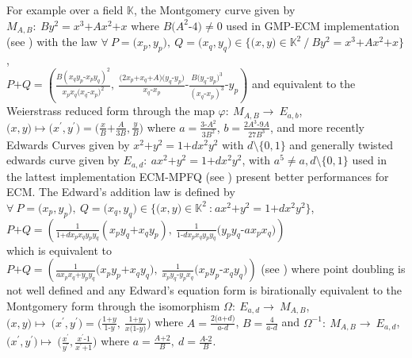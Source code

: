 \documentclass[sigconf,balance=false]{acmart}
\begin{document}
\begin{enumerate}
For example over a field $\mathbb{K}$, the Montgomery curve given by $M_{A, B}: \  By^{2}=x^{3}\text{+}Ax^{2}\text{+}x$ where $B\text{(}A^{2}\text{-}4\text{)}\neq 0$ used in GMP-ECM implementation (see \cite{gmp}) with the law $\forall \ P=\text{(}x_{p}, y_{p}\text{)}, \ Q=\text{(}x_{q}, y_{q}\text{)} \in \lbrace \text{(}x, y\text{)}\in \mathbb{K}^2 \ / \ By^{2}=x^{3}\text{+}Ax^{2}\text{+}x \rbrace$,\\ $P\text{+}Q=\left(\frac{B\left(x_{q}y_{p}\text{-}x_{p}y_{q}\right)^2}{x_{p}x_{q}\text{(}x_{q}\text{-}x_{p}\text{)}^2}, \ \frac{\text{(}2x_{p}\text{+}x_{q}\text{+}A\text{)}\text{(}y_{q}\text{-}y_{p}\text{)}}{x_{q}\text{-}x_{p}}\text{-}\frac{B\text{(}y_{q}\text{-}y_{p}\text{)}^3}{(x_{q}\text{-}x_{p})^3}\text{-}y_{p} \right)$ and equivalent to the Weierstrass reduced form through the map $\varphi: \ M_{A, B} \longrightarrow \ E_{a, b}$, $\text{(}x, y\text{)}\longmapsto \text{(}x^{'}, y^{'}\text{)}=\text{(}\frac{x}{B}\text{+}\frac{A}{3B}, \frac{y}{B}\text{)}$ where $a=\frac{3\text{-}A^2}{3B^2}$, $b=\frac{2A^3\text{-}9A}{27B^3}$, and more recently Edwards Curves given by $x^{2}\text{+}y^{2}=1\text{+}dx^{2}y^{2}$ with $ d\setminus \lbrace 0, 1 \rbrace$ and generally twisted edwards curve given by $E_{a, d}: \ ax^{2}\text{+}y^{2}=1\text{+}dx^{2}y^{2}$, with $a^{5}\neq a, d\setminus \lbrace 0, 1 \rbrace$ used in the lattest implementation ECM-MPFQ (see \cite{mpfq}) present better performances for ECM. The Edward's addition law is defined by $\forall \ P=\text{(}x_{p}, y_{p}\text{)}, \ Q=\text{(}x_{q}, y_{q}\text{)} \in \lbrace \text{(}x, y\text{)}\in \mathbb{K}^2 \ \text{:} \ ax^{2}\text{+}y^{2}=1\text{+}dx^{2}y^{2} \rbrace$,\\ $P\text{+}Q=\left(\frac{1}{1\text{+}dx_{p}x_{q}y_{p}y_{q}}(x_{p}y_{q}\text{+}x_{q}y_{p}), \ \frac{1}{1\text{-}dx_{p}x_{q}y_{p}y_{q}}\text{(}y_{p}y_{q}\text{-}ax_{p}x_{q}\text{)} \right)$\\
which is equivalent to\\
$P\text{+}Q= \left( \frac{1}{ax_{p}x_{q}\text{+}y_{p}y_{q}}\text{(}x_{p}y_{p}\text{+}x_{q}y_{q}\text{)}, \ \frac{1}{x_{p}y_{q}\text{-}y_{p}x_{q}}\text{(}x_{p}y_{p}\text{-}x_{q}y_{q}\text{)}\right)$ (see \cite{edt}) where point doubling is not well defined and any Edward's equation form is birationally equivalent to the Montgomery form through the isomorphism $\Omega: \ E_{a,d}\longrightarrow \ M_{A,B}$,      $\text{(}x, y\text{)} \longmapsto \ \text{(}x^{'}, y^{'}\text{)}=\text{(} \frac{1\text{+}y}{1\text{-}y}, \ \frac{1\text{+}y}{x\text{(}1\text{-}y\text{)}}\text{)}$ where $A=\frac{2\text{(}a\text{+}d\text{)}}{a\text{-}d}$, $B=\frac{4}{a\text{-}d}$ and $ \Omega ^{-1}: \ M_{A, B} \longrightarrow \ E_{a, d}$, $\text{(}x^{'}, y^{'}\text{)} \longmapsto \ \text{(}\frac{x^{'}}{y^{'}},  \frac{x^{'}\text{-}1}{x^{'}\text{+}1}{\text{)}}$ where $a=\frac{A\text{+}2}{B}, \ d= \frac{A\text{-}2}{B}$.\\


\end{enumerate}
\end{document}
